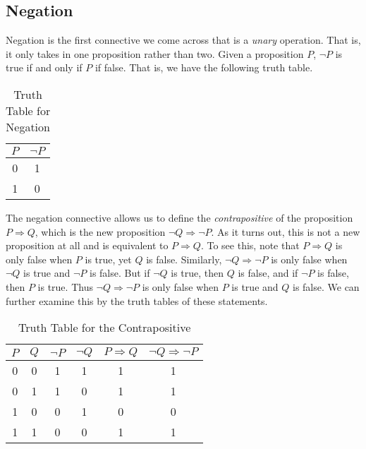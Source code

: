     \subsection{Negation}
        Negation is the first connective we come across that is a \textit{unary}
        operation. That is, it only takes in one proposition rather than two.
        Given a proposition $P$, $\neg{P}$ is true if and only if $P$ if false.
        That is, we have the following truth table.
        \begin{table}[H]
            \centering
            \captionsetup{type=table}
            \begin{tabular}{cc}
                $P$&$\neg{P}$\\
                \hline
                0&1\\
                1&0
            \end{tabular}
            \caption{Truth Table for Negation}
            \label{tab:Truth_Table_for_Negation}
        \end{table}
        The negation connective allows us to define the
        \textit{contrapositive} of the proposition
        $P\Rightarrow{Q}$, which is the new proposition
        $\neg{Q}\Rightarrow\neg{P}$. As it turns out, this is not a new
        proposition at all and is equivalent to $P\Rightarrow{Q}$. To see this,
        note that $P\Rightarrow{Q}$ is only false when $P$ is true, yet $Q$ is
        false. Similarly, $\neg{Q}\Rightarrow\neg{P}$ is only false when
        $\neg{Q}$ is true and $\neg{P}$ is false. But if $\neg{Q}$ is true, then
        $Q$ is false, and if $\neg{P}$ is false, then $P$ is true. Thus
        $\neg{Q}\Rightarrow\neg{P}$ is only false when $P$ is true and $Q$ is
        false. We can further examine this by the truth tables of these
        statements.
        \begin{table}[H]
            \centering
            \captionsetup{type=table}
            \begin{tabular}{cccccc}
                $P$&$Q$&$\neg{P}$&$\neg{Q}$
                    &$P\Rightarrow{Q}$&$\neg{Q}\Rightarrow\neg{P}$\\
                \hline
                0&0&1&1&1&1\\
                0&1&1&0&1&1\\
                1&0&0&1&0&0\\
                1&1&0&0&1&1
            \end{tabular}
            \caption{Truth Table for the Contrapositive}
            \label{tab:Truth_Table_for_Contrapositive}
        \end{table}
